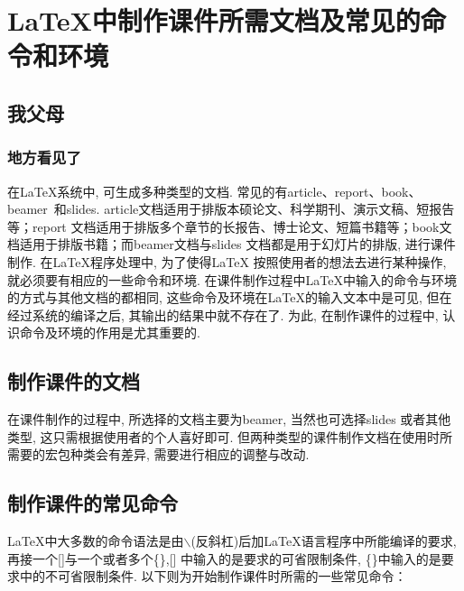 \section{\LaTeX{}中制作课件所需文档及常见的命令和环境}
\subsection{我父母}
\subsubsection{地方看见了}

在\LaTeX{}系统中, 可生成多种类型的文档. 常见的有article、report、book、beamer~和slides. article文档适用于排版本硕论文、科学期刊、演示文稿、短报告等；report 文档适用于排版多个章节的长报告、博士论文、短篇书籍等；book文档适用于排版书籍；而beamer文档与slides 文档都是用于幻灯片的排版, 进行课件制作. 在\LaTeX{}程序处理中, 为了使得\LaTeX{} 按照使用者的想法去进行某种操作, 就必须要有相应的一些命令和环境. 在课件制作过程中\LaTeX{}中输入的命令与环境的方式与其他文档的都相同, 这些命令及环境在\LaTeX{}的输入文本中是可见, 但在经过系统的编译之后, 其输出的结果中就不存在了. 为此, 在制作课件的过程中, 认识命令及环境的作用是尤其重要的.

\subsection{制作课件的文档}

在课件制作的过程中, 所选择的文档主要为beamer, 当然也可选择slides 或者其他类型, 这只需根据使用者的个人喜好即可. 但两种类型的课件制作文档在使用时所需要的宏包种类会有差异, 需要进行相应的调整与改动.
\subsection{制作课件的常见命令}
\LaTeX{}中大多数的命令语法是由$\backslash$(反斜杠)后加\LaTeX{}语言程序中所能编译的要求, 再接一个[]与一个或者多个\{\},[] 中输入的是要求的可省限制条件, \{\}中输入的是要求中的不可省限制条件. 以下则为开始制作课件时所需的一些常见命令：

